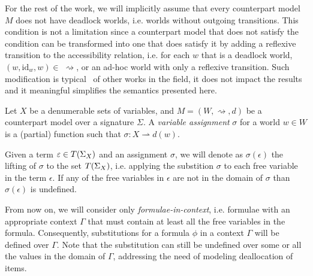 For the rest of the work, we will implicitly assume that every counterpart model $M$ does not have deadlock worlds, i.e.
worlds without outgoing transitions. This condition is not a limitation since a counterpart model that does not satisfy
the condition can be transformed into one that does satisfy it by adding a reflexive transition to the accessibility
relation, i.e. for each $w$ that is a deadlock world, $(w, \text{id}_w, w) \in\;\rightsquigarrow$, or an ad-hoc world
with only a reflexive transition. Such modification is typical~\cite{baier_principles_2008} of other works in the field,
it does not impact the results and it meaningful simplifies the semantics presented here.

\begin{definition}
  Let $X$ be a denumerable sets of variables, and $M = (W, \rightsquigarrow, d)$ be a counterpart model over a signature
  $\Sigma$. A \emph{variable assignment} $\sigma$ for a world $w \in W$ is a (partial) function such that $\sigma : X
  \rightharpoonup d(w)$.
\end{definition}

Given a term $\varepsilon \in T({\Sigma}_{X})$ and an assignment $\sigma$, we will denote as
$\sigma(\epsilon)$ the lifting of $\sigma$ to the set $T({\Sigma}_{X})$, i.e. applying the substition $\sigma$ to each
free variable in the term $\epsilon$. If any of the free variables in $\epsilon$ are not in the domain of $\sigma$ than $\sigma(\epsilon)$ is undefined.

From now on, we will consider only \emph{formulae-in-context}, i.e. formulae with an appropriate context $\Gamma$ that
must contain at least all the free variables in the formula. Consequently, substitutions for a formula $\phi$ in a
context $\Gamma$ will be defined over $\Gamma$. Note that the substitution can still be undefined over some
or all the values in the domain of $\Gamma$, addressing the need of modeling deallocation of items.
